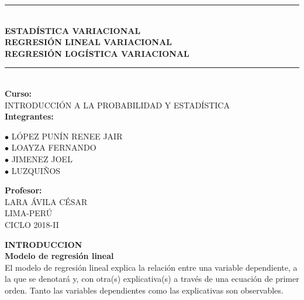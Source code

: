 \documentclass[a4paper,11pt]{article}
\begin{document}
	\begin{center}
		\rule{15cm}{0.8mm}\\
		\vspace*{3mm}
		{\bf ESTADÍSTICA VARIACIONAL\\
		REGRESIÓN LINEAL VARIACIONAL\\
		REGRESIÓN LOGÍSTICA VARIACIONAL}
		\rule{15cm}{0.8mm}\\
		\vspace*{4mm}
		{\bf Curso:}\\
		INTRODUCCIÓN A LA PROBABILIDAD Y ESTADÍSTICA\\
		\vspace*{4mm}
		{\bf Integrantes:}\\
		\begin{flushleft}
			\hspace{5cm}$\bullet$ LÓPEZ PUNÍN RENEE JAIR\\
			\hspace{5cm}$\bullet$ LOAYZA FERNANDO\\
			\hspace{5cm}$\bullet$ JIMENEZ JOEL\\
			\hspace{5cm}$\bullet$ LUZQUIÑOS\\
		\end{flushleft}
		\vspace*{4mm}
		{\bf Profesor:}\\
		LARA ÁVILA CÉSAR\\
		\vspace*{6cm}
		LIMA-PERÚ\\
		CICLO 2018-II
	\end{center}
	\newpage
	{\bf INTRODUCCION}\\
	\textbf{Modelo de regresión lineal}\\
	El modelo de regresión lineal explica la relación entre una variable dependiente, a la
	que se denotará y, con otra(s) explicativa(s) a través de una ecuación de primer orden.
	Tanto las variables dependientes como las explicativas son observables.
\end{document}
